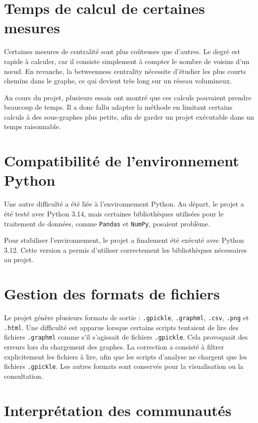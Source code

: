 \documentclass[11pt,a4paper,oneside,openany]{report}
\begin{document}
\section{Temps de calcul de certaines mesures}

Certaines mesures de centralité sont plus coûteuses que d’autres. Le degré est rapide à calculer, car il consiste simplement à compter le nombre de voisins d’un nœud. En revanche, la betweenness centrality nécessite d’étudier les plus courts chemins dans le graphe, ce qui devient très long sur un réseau volumineux.

Au cours du projet, plusieurs essais ont montré que ces calculs pouvaient prendre beaucoup de temps. Il a donc fallu adapter la méthode en limitant certains calculs à des sous-graphes plus petits, afin de garder un projet exécutable dans un temps raisonnable.

\section{Compatibilité de l’environnement Python}

Une autre difficulté a été liée à l’environnement Python. Au départ, le projet a été testé avec Python 3.14, mais certaines bibliothèques utilisées pour le traitement de données, comme \texttt{Pandas} et \texttt{NumPy}, posaient problème.

Pour stabiliser l’environnement, le projet a finalement été exécuté avec Python 3.12. Cette version a permis d’utiliser correctement les bibliothèques nécessaires au projet.

\section{Gestion des formats de fichiers}

Le projet génère plusieurs formats de sortie : \texttt{.gpickle}, \texttt{.graphml}, \texttt{.csv}, \texttt{.png} et \texttt{.html}. Une difficulté est apparue lorsque certains scripts tentaient de lire des fichiers \texttt{.graphml} comme s’il s’agissait de fichiers \texttt{.gpickle}. Cela provoquait des erreurs lors du chargement des graphes. La correction a consisté à filtrer explicitement les fichiers à lire, afin que les scripts d’analyse ne chargent que les fichiers \texttt{.gpickle}. Les autres formats sont conservés pour la visualisation ou la consultation.

\section{Interprétation des communautés}
\end{document}
